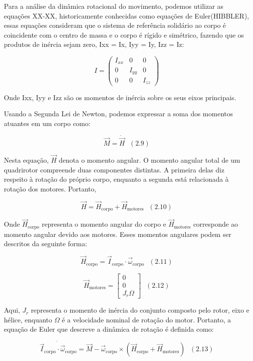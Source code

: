 \documentclass[
	12pt,				%
	openright,			%
	twoside,			%
	a4paper,			%
	english,			%
	brazil				%
	]{abntex2}
\begin{document}
Para a análise da dinâmica rotacional do movimento, podemos utilizar as equações XX-XX, historicamente conhecidas como equações de Euler(HIBBLER), essas equações consideram que o sistema de referência solidário ao corpo é coincidente com o centro de massa e o corpo é rígido e simétrico, fazendo que os produtos de inércia sejam zero, Ixx = Ix, Iyy = Iy, Izz = Iz:

\begin{equation*}
	I = \begin{pmatrix}
		I_{xx}  & 0      & 0 \\
		0       & I_{yy} & 0   \\
		0       & 0      & I_{zz}
	\end{pmatrix}
\end{equation*}

Onde Ixx, Iyy e Izz são os momentos de inércia sobre os seus eixos principais.

Usando a Segunda Lei de Newton, podemos expressar a soma dos momentos atuantes em um corpo como:

\[ \vec{M} = \dot{\vec{H}} \ \ \ (2.9) \]

Nesta equação, \(\vec{H}\) denota o momento angular. O momento angular total de um quadrirotor compreende duas componentes distintas. A primeira delas diz respeito à rotação do próprio corpo, enquanto a segunda está relacionada à rotação dos motores. Portanto,

\[ \vec{H} = \vec{H}_{\text{corpo}} + \vec{H}_{\text{motores}} \ \ \ (2.10) \]

Onde \(\vec{H}_{\text{corpo}}\) representa o momento angular do corpo e \(\vec{H}_{\text{motores}}\) corresponde ao momento angular devido aos motores. Esses momentos angulares podem ser descritos da seguinte forma:

\[ \vec{H}_{\text{corpo}} = \vec{I}_{\text{corpo}} \cdot \vec{\omega}_{\text{corpo}} \ \ \ (2.11) \]

\[ \vec{H}_{\text{motores}} = \begin{bmatrix} 0 \\ 0 \\ J_r \Omega \end{bmatrix} \ \ \ (2.12) \]

Aqui, \(J_r\) representa o momento de inércia do conjunto composto pelo rotor, eixo e hélice, enquanto \(\Omega\) é a velocidade nominal de rotação do motor. Portanto, a equação de Euler que descreve a dinâmica de rotação é definida como:

\[ \dot{\vec{I}_{\text{corpo}} \cdot \vec{\omega}_{\text{corpo}}} = \vec{M} - \vec{\omega}_{\text{corpo}} \times (\vec{H}_{\text{corpo}} + \vec{H}_{\text{motores}}) \ \ \ (2.13) \]
\end{document}
